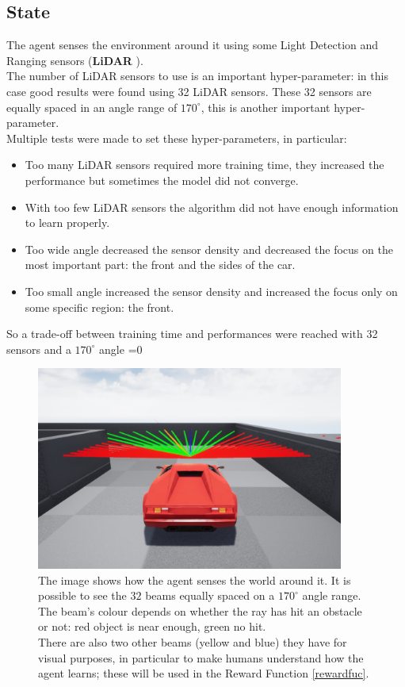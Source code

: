 \documentclass[14pt]{extarticle}
\def\sp{\vspace{5pt}}
\newcounter{debug}
\begin{document}
\begin{flushleft}
	\subsection{State}
	\sp
	The agent senses the environment around it using some Light Detection and Ranging sensors (\textbf{LiDAR} \cite{LiDAR}). \\
	The number of LiDAR sensors to use is an important hyper-parameter: in this case good results were found using 32 LiDAR sensors. These 32 sensors are equally spaced in an angle range of $170^{\circ}$, this is another important hyper-parameter. \\
	Multiple tests were made to set these hyper-parameters, in particular:
	\begin{itemize}
	\item Too many LiDAR sensors required more training time, they increased the performance but sometimes the model did not converge.
	\item With too few LiDAR sensors the algorithm did not have enough information to learn properly.
	\item Too wide angle decreased the sensor density and decreased the focus on the most important part: the front and the sides of the car.
	\item Too small angle increased the sensor density and increased the focus only on some specific region: the front.
	\end{itemize}
	So a trade-off between training time and performances were reached with 32 sensors and a $170^{\circ}$ angle
	\ifnum\value{debug}=0 {
	\begin{figure}[H] \label{carState}
    		\centering\includegraphics[width=0.9\textwidth]{./Image/State/carSensors.png}
		\vspace{2mm}
		\caption{The image shows how the agent senses the world around it. It is possible to see the $32$ beams equally spaced on a $170^{\circ}$ angle range. \\
		The beam's colour depends on whether the ray has hit an obstacle or not: red object is near enough, green no hit. \\
		There are also two other beams (yellow and blue) they have for visual purposes, in particular to make humans understand how the agent learns; these will be used in the Reward Function \ref{rewardfuc}.}
	\end{figure}
	}\fi
	

\end{flushleft}
\end{document}
